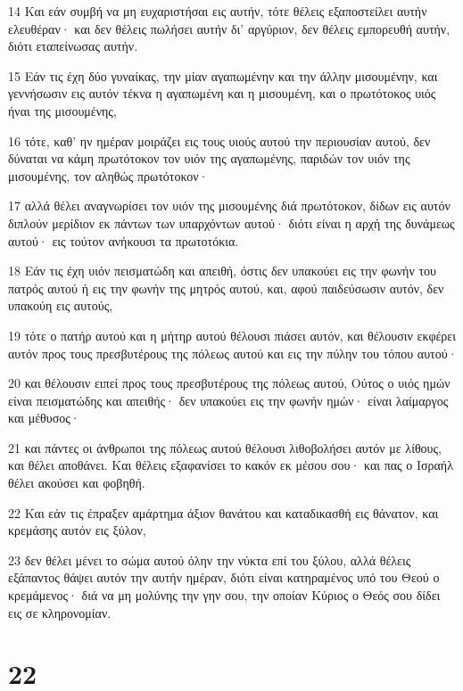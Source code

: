 \par 14 Και εάν συμβή να μη ευχαριστήσαι εις αυτήν, τότε θέλεις εξαποστείλει αυτήν ελευθέραν· και δεν θέλεις πωλήσει αυτήν δι' αργύριον, δεν θέλεις εμπορευθή αυτήν, διότι εταπείνωσας αυτήν.
\par 15 Εάν τις έχη δύο γυναίκας, την μίαν αγαπωμένην και την άλλην μισουμένην, και γεννήσωσιν εις αυτόν τέκνα η αγαπωμένη και η μισουμένη, και ο πρωτότοκος υιός ήναι της μισουμένης,
\par 16 τότε, καθ' ην ημέραν μοιράζει εις τους υιούς αυτού την περιουσίαν αυτού, δεν δύναται να κάμη πρωτότοκον τον υιόν της αγαπωμένης, παριδών τον υιόν της μισουμένης, τον αληθώς πρωτότοκον·
\par 17 αλλά θέλει αναγνωρίσει τον υιόν της μισουμένης διά πρωτότοκον, δίδων εις αυτόν διπλούν μερίδιον εκ πάντων των υπαρχόντων αυτού· διότι είναι η αρχή της δυνάμεως αυτού· εις τούτον ανήκουσι τα πρωτοτόκια.
\par 18 Εάν τις έχη υιόν πεισματώδη και απειθή, όστις δεν υπακούει εις την φωνήν του πατρός αυτού ή εις την φωνήν της μητρός αυτού, και, αφού παιδεύσωσιν αυτόν, δεν υπακούη εις αυτούς,
\par 19 τότε ο πατήρ αυτού και η μήτηρ αυτού θέλουσι πιάσει αυτόν, και θέλουσιν εκφέρει αυτόν προς τους πρεσβυτέρους της πόλεως αυτού και εις την πύλην του τόπου αυτού·
\par 20 και θέλουσιν ειπεί προς τους πρεσβυτέρους της πόλεως αυτού, Ούτος ο υιός ημών είναι πεισματώδης και απειθής· δεν υπακούει εις την φωνήν ημών· είναι λαίμαργος και μέθυσος·
\par 21 και πάντες οι άνθρωποι της πόλεως αυτού θέλουσι λιθοβολήσει αυτόν με λίθους, και θέλει αποθάνει. Και θέλεις εξαφανίσει το κακόν εκ μέσου σου· και πας ο Ισραήλ θέλει ακούσει και φοβηθή.
\par 22 Και εάν τις έπραξεν αμάρτημα άξιον θανάτου και καταδικασθή εις θάνατον, και κρεμάσης αυτόν εις ξύλον,
\par 23 δεν θέλει μένει το σώμα αυτού όλην την νύκτα επί του ξύλου, αλλά θέλεις εξάπαντος θάψει αυτόν την αυτήν ημέραν, διότι είναι κατηραμένος υπό του Θεού ο κρεμάμενος· διά να μη μολύνης την γην σου, την οποίαν Κύριος ο Θεός σου δίδει εις σε κληρονομίαν.

\chapter{22}

